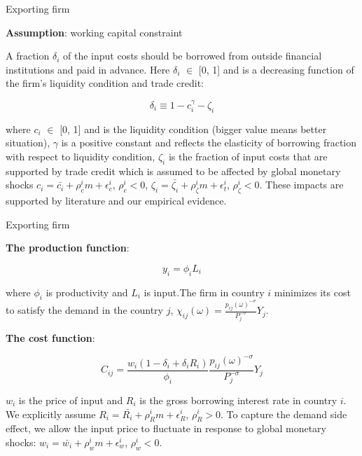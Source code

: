 \documentclass[10pt]{beamer}
\begin{document}
\begin{frame}{Exporting firm}

\textbf{Assumption}: working capital constraint
\vfill

A fraction $\delta_i$ of the input costs should be borrowed from outside financial institutions and paid in advance. Here $\delta_i$ $\in$ [0, 1] and is a decreasing function of the firm's liquidity condition and trade credit: 

$$
\delta_i \equiv 1-c_i^\gamma-\zeta_i
$$

where $c_i$ $\in$ [0, 1] and is the liquidity condition (bigger value means better situation), $\gamma$ is a positive constant and reflects the elasticity of borrowing fraction with respect to liquidity condition, $\zeta_i$ is the fraction of input costs that are supported by trade credit which is assumed to be affected by global monetary shocks $c_i=\bar{c_i}+\rho_c^i m+\epsilon_c^i$, $\rho_c^i<0$, $\zeta_i=\bar{\zeta_i}+\rho_\zeta^i m+\epsilon_t^i$,  $\rho_\zeta^i<0$. These impacts are supported by literature and our empirical evidence.

\end{frame}


\begin{frame}{Exporting firm}

\textbf{The production function}:

$$
y_i= \phi_i L_i
$$

where $\phi_i$ is productivity and $L_i$ is input.The firm in country $i$ minimizes its cost to satisfy the demand in the country $j$, $\chi_{ij}(\omega)=\frac{p_{ij}(\omega)^{-\sigma}}{P_j^{-\sigma}} Y_j$.
\vfill

\textbf{The cost function}:

$$
C_{ij}=\frac{w_i(1-\delta_i+\delta_i R_i)}{\phi_i} \frac{p_{ij}(\omega)^{-\sigma}}{P_j^{-\sigma}} Y_j
$$ 

$w_i$ is the price of input and $R_i$ is the gross borrowing interest rate in country $i$. We explicitly assume $R_i=\bar{R_i}+\rho_R^i m+\epsilon_R^i$, $\rho_R^i>0$. To capture the demand side effect, we allow the input price to fluctuate in response to global monetary shocks: $w_i=\bar{w_i}+\rho_w^i m + \epsilon_w^i$, $\rho_w^i<0$.

\end{frame}
\end{document}
